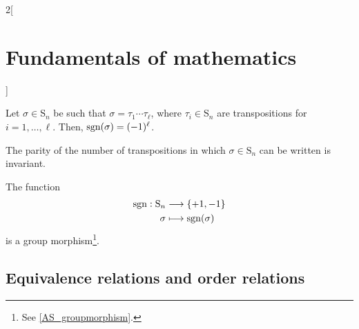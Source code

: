 \documentclass[../../../main.tex]{subfiles}
\begin{document}
\begin{multicols}{2}[\section{Fundamentals of mathematics}]
\begin{theorem}
  \end{theorem}
  \begin{corollary}
    Let $\sigma\in \text{S}_n$ be such that $\sigma=\tau_1\cdots\tau_\ell$, where $\tau_i\in \text{S}_n$ are transpositions for $i=1,\ldots,\ell$. Then, $\operatorname{sgn}(\sigma)=(-1)^\ell$.
  \end{corollary}
  \begin{corollary}
    The parity of the number of transpositions in which $\sigma\in \text{S}_n$ can be written is invariant.
  \end{corollary}
  \begin{corollary}
    The function
    \begin{align*}
      \operatorname{sgn}:\text{S}_n & \longrightarrow\{+1,-1\} \\
      \sigma           & \longmapsto\operatorname{sgn}(\sigma)
    \end{align*}
    is a group morphism\footnote{See \cref{AS_groupmorphism}.}.
  \end{corollary}
  \subsection{Equivalence relations and order relations}

\end{multicols}
\end{document}
